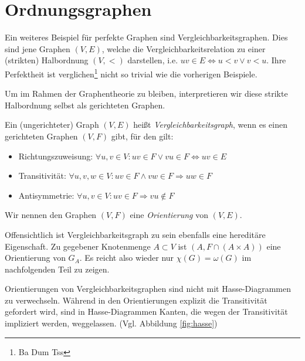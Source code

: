\documentclass[../main.tex]{subfiles}
\begin{document}
\chapter{Ordnungsgraphen}
\label{chapter:ordnungsgraphen}

Ein weiteres Beispiel für perfekte Graphen sind Vergleichbarkeitsgraphen. Dies sind jene Graphen $(V, E)$, welche die Vergleichbarkeitsrelation zu einer (strikten) Halbordnung $(V, <)$ darstellen, i.e. $uv \in E \Leftrightarrow u < v \vee v < u$. Ihre Perfektheit ist verglichen\footnote{Ba Dum Tss} nicht so trivial wie die vorherigen Beispiele.

Um im Rahmen der Graphentheorie zu bleiben, interpretieren wir diese strikte Halbordnung selbst als gerichteten Graphen.

\begin{definition}[Vergleichbarkeitsgraph]
    Ein (ungerichteter) Graph $(V, E)$ heißt \emph{Vergleichbarkeitsgraph}, wenn es einen gerichteten Graphen $(V, F)$ gibt, für den gilt:
    \begin{itemize}
        \item Richtungszuweisung: $\forall u, v \in V : uv \in F \vee vu \in F \Leftrightarrow uv \in E$
        \item Transitivität: $\forall u, v, w \in V : uv \in F \wedge vw \in F \Rightarrow uw \in F$
        \item Antisymmetrie: $\forall u, v \in V : uv \in F \Rightarrow vu \notin F$
    \end{itemize}
    Wir nennen den Graphen $(V, F)$ eine \emph{Orientierung} von $(V, E)$.
\end{definition}

Offensichtlich ist Vergleichbarkeitsgraph zu sein ebenfalls eine hereditäre Eigenschaft. Zu gegebener Knotenmenge $A \subset V$ ist $(A, F \cap (A \times A))$ eine Orientierung von $G_A$. Es reicht also wieder nur $\chi(G) = \omega(G)$ im nachfolgenden Teil zu zeigen.

\begin{bemerkung}
    Orientierungen von Vergleichbarkeitsgraphen sind nicht mit Hasse-Diagrammen zu verwechseln. Während in den Orientierungen explizit die Transitivität gefordert wird, sind in Hasse-Diagrammen Kanten, die wegen der Transitivität impliziert werden, weggelassen. (Vgl. Abbildung \ref{fig:hasse})
\end{bemerkung}
\end{document}
